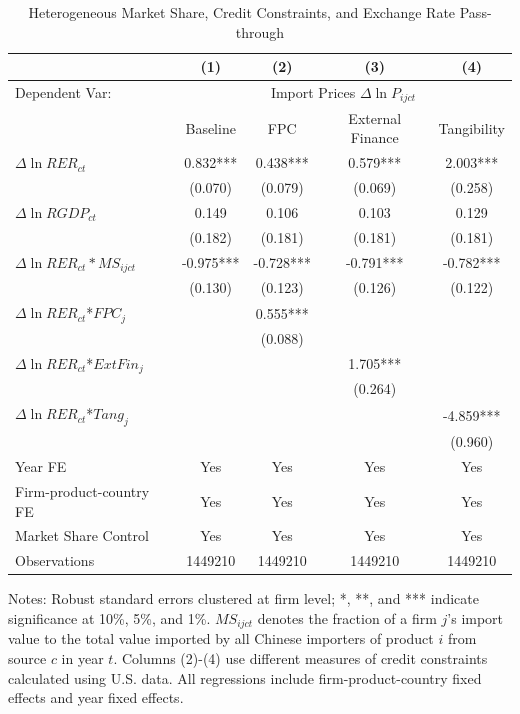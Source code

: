\begin{table}[htb]
	\centering
	\caption{Heterogeneous Market Share, Credit Constraints, and Exchange Rate Pass-through}
	\begin{threeparttable}
		\begin{tabular}{lcccc}
			\toprule
			& (1)   & (2)   & (3)   & (4) \\
			\midrule
                Dependent Var: & \multicolumn{4}{c}{ Import Prices $\Delta \ln P_{ijct}$} \\
			&  Baseline     & FPC & External Finance& Tangibility        \\
			\midrule
			$\Delta \ln RER_{ct}$ & 0.832*** & 0.438*** & 0.579*** & 2.003*** \\
			& (0.070) & (0.079) & (0.069) & (0.258) \\
			$\Delta \ln RGDP_{ct}$ & 0.149 & 0.106 & 0.103 & 0.129 \\
			& (0.182) & (0.181) & (0.181) & (0.181) \\
			$\Delta \ln RER_{ct}*MS_{ijct}$ & -0.975*** & -0.728*** & -0.791*** & -0.782*** \\
			& (0.130) & (0.123) & (0.126) & (0.122) \\
			$\Delta \ln RER_{ct}$*$FPC_{j}$ &  & 0.555*** &       &  \\
			&  & (0.088) &       &  \\
			$\Delta \ln RER_{ct}$*$ExtFin_{j}$ &   &       & 1.705*** &  \\
			&  &       & (0.264) &  \\
			$\Delta \ln RER_{ct}$*$Tang_{j}$ &   &       &       & -4.859*** \\
			&   &       &       & (0.960) \\
                \midrule
			Year FE  & Yes  & Yes   & Yes   & Yes \\
			Firm-product-country FE & Yes    & Yes   & Yes   & Yes \\
			Market Share Control & Yes   & Yes   & Yes   & Yes \\
			Observations & 1449210  & 1449210 & 1449210 & 1449210 \\
			\bottomrule
		\end{tabular}
		\begin{tablenotes}
			\footnotesize
			\item Notes: Robust standard errors clustered at firm level; *, **, and *** indicate significance at 10\%, 5\%, and 1\%. $MS_{ijct}$ denotes the fraction of a firm $j$'s import value to the total value imported by all Chinese importers of product $i$ from source $c$ in year $t$. Columns (2)-(4) use different measures of credit constraints calculated using U.S. data. All regressions include firm-product-country fixed effects and year fixed effects.
		\end{tablenotes}
	\end{threeparttable}
	\label{tab.share}
\end{table}

